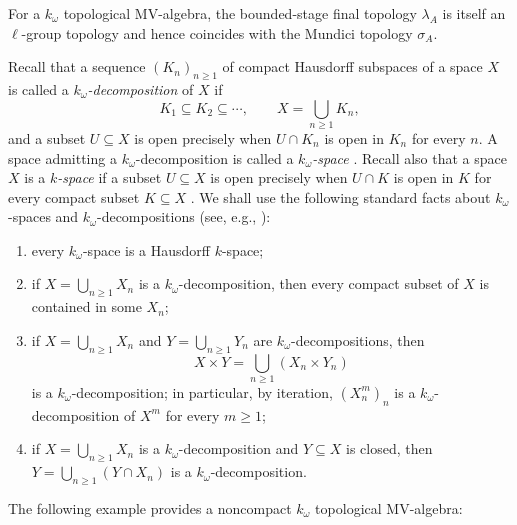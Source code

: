 \documentclass[preprint,3p]{elsarticle}
\theoremstyle{plain}
\theoremstyle{definition}
\numberwithin{equation}{section}
\begin{document}
For a $k_\omega$ topological MV-algebra, the bounded-stage final
topology $\lambda_A$ is itself an $\ell$-group topology and hence
coincides with the Mundici topology $\sigma_A$.

Recall that a sequence $(K_n)_{n\geq1}$ of compact Hausdorff
subspaces of a space $X$ is called a \emph{$k_\omega$-decomposition}
of $X$ if
\[
 K_1\subseteq K_2\subseteq\cdots,\qquad
 X=\bigcup_{n\geq1}K_n,
\]
and a subset $U\subseteq X$ is open precisely when
$U\cap K_n$ is open in $K_n$ for every $n$.
A space admitting a $k_\omega$-decomposition is called a
\emph{$k_\omega$-space} \cite{Franklin1977}.  Recall also that a space $X$ is a
\emph{$k$-space} if a subset $U\subseteq X$ is open precisely when
$U\cap K$ is open in $K$ for every compact subset $K\subseteq X$ \cite{Willard1970}.
We shall use the following standard facts about $k_\omega$-spaces
and $k_\omega$-decompositions
(see, e.g., \cite[items~1, 3, 4, and~14]{Franklin1977}):
\begin{enumerate}[label=(K\arabic*),ref=(K\arabic*)]
\item\label{komega-Hausdorff-k-space}
every $k_\omega$-space is a Hausdorff $k$-space;
\item\label{komega-compact-stage}
if $X=\bigcup_{n\geq1}X_n$ is a $k_\omega$-decomposition, then every
compact subset of $X$ is contained in some $X_n$;
\item\label{komega-finite-products}
if $X=\bigcup_{n\geq1}X_n$ and $Y=\bigcup_{n\geq1}Y_n$ are
$k_\omega$-decompositions, then
\[
 X\times Y=\bigcup_{n\geq1}(X_n\times Y_n)
\]
is a $k_\omega$-decomposition; in particular, by iteration,
$(X_n^m)_n$ is a $k_\omega$-decomposition of $X^m$ for every $m\geq1$;
\item\label{komega-closed-subspaces}
if $X=\bigcup_{n\geq1}X_n$ is a $k_\omega$-decomposition and
$Y\subseteq X$ is closed, then
$Y=\bigcup_{n\geq1}(Y\cap X_n)$ is a $k_\omega$-decomposition.
\end{enumerate}

The following example provides a noncompact $k_\omega$ topological MV-algebra:
\end{document}
